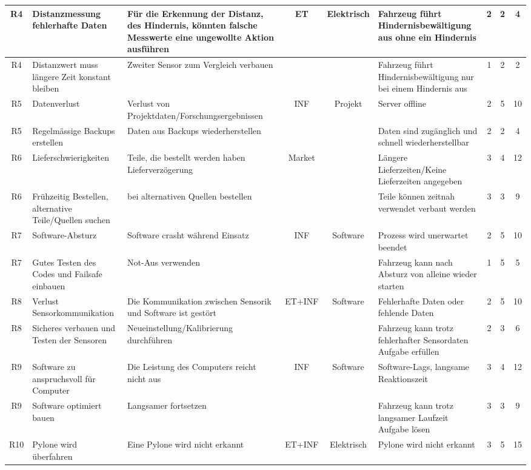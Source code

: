 \documentclass[../main.tex]{subfiles}
\begin{document}
\begin{landscape}
\begin{longtable}{|c|p{4cm}|p{4cm}|c|c|p{4cm}|c|c|c|}
\rowcolor{white} R4 & Distanzmessung fehlerhafte Daten & Für die Erkennung der Distanz, des Hindernis, könnten falsche Messwerte eine ungewollte Aktion ausführen & ET & Elektrisch & Fahrzeug führt Hindernisbewältigung aus ohne ein Hindernis & 2 & 2 & 4 \\ \hline
\rowcolor{white} R4 & Distanzwert muss längere Zeit konstant bleiben & Zweiter Sensor zum Vergleich verbauen & & & Fahrzeug führt Hindernisbewältigung nur bei einem Hindernis aus & 1 & 2 & 2 \\ \hline

\rowcolor[HTML]{F5F5F5} R5 & Datenverlust & Verlust von Projektdaten/Forschungsergebnissen & INF & Projekt & Server offline & 2 & 5 & 10 \\ \hline
\rowcolor[HTML]{F5F5F5} R5 & Regelmässige Backups erstellen & Daten aus Backups wiederherstellen & & & Daten sind zugänglich und schnell wiederherstellbar & 2 & 2 & 4 \\ \hline

\rowcolor{white} R6 & Lieferschwierigkeiten & Teile, die bestellt werden haben Lieferverzögerung & Market & & Längere Lieferzeiten/Keine Lieferzeiten angegeben & 3 & 4 & 12 \\ \hline
\rowcolor{white} R6 & Frühzeitig Bestellen, alternative Teile/Quellen suchen & bei alternativen Quellen bestellen & & & Teile können zeitnah verwendet verbaut werden & 3 & 3 & 9 \\ \hline

\rowcolor[HTML]{F5F5F5} R7 & Software-Absturz & Software crasht während Einsatz & INF & Software & Prozess wird unerwartet beendet & 2 & 5 & 10 \\ \hline
\rowcolor[HTML]{F5F5F5} R7 & Gutes Testen des Codes und Failsafe einbauen & Not-Aus verwenden & & & Fahrzeug kann nach Absturz von alleine wieder starten & 1 & 5 & 5 \\ \hline

\rowcolor{white} R8 & Verlust Sensorkommunikation & Die Kommunikation zwischen Sensorik und Software ist gestört & ET+INF & Software & Fehlerhafte Daten oder fehlende Daten & 2 & 5 & 10 \\ \hline
\rowcolor{white} R8 & Sicheres verbauen und Testen der Sensoren & Neueinstellung/Kalibrierung durchführen & & & Fahrzeug kann trotz fehlerhafter Sensordaten Aufgabe erfüllen & 2 & 3 & 6 \\ \hline


\rowcolor[HTML]{F5F5F5} R9 & Software zu anspruchsvoll für Computer & Die Leistung des Computers reicht nicht aus & INF & Software & Software-Lags, langsame Reaktionszeit & 3 & 4 & 12 \\ \hline
\rowcolor[HTML]{F5F5F5} R9 & Software optimiert bauen & Langsamer fortsetzen & & & Fahrzeug kann trotz langsamer Laufzeit Aufgabe lösen & 3 & 3 & 9 \\ \hline
\rowcolor{white} R10 & Pylone wird überfahren & Eine Pylone wird nicht erkannt & ET+INF & Elektrisch & Pylone wird nicht erkannt & 3 & 5 & 15 \\ \hline


\end{longtable}
\end{landscape}
\end{document}
